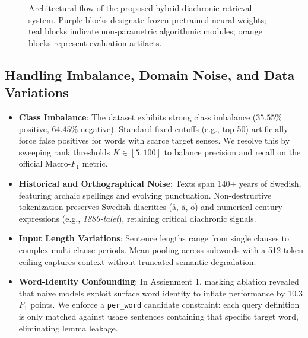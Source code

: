 \begin{figure}[H]
\caption{Architectural flow of the proposed hybrid diachronic retrieval system. Purple blocks designate frozen pretrained neural weights; teal blocks indicate non-parametric algorithmic modules; orange blocks represent evaluation artifacts.}
\label{fig:method_pipeline}
\end{figure}

\subsection{Handling Imbalance, Domain Noise, and Data Variations}
\begin{itemize}
    \item \textbf{Class Imbalance}: The dataset exhibits strong class imbalance ($35.55\%$ positive, $64.45\%$ negative). Standard fixed cutoffs (e.g., top-50) artificially force false positives for words with scarce target senses. We resolve this by sweeping rank thresholds $K \in [5, 100]$ to balance precision and recall on the official Macro-$F_1$ metric.
    \item \textbf{Historical and Orthographical Noise}: Texts span 140+ years of Swedish, featuring archaic spellings and evolving punctuation. Non-destructive tokenization preserves Swedish diacritics (\aa, \"a, \"o) and numerical century expressions (e.g., \textit{1880-talet}), retaining critical diachronic signals.
    \item \textbf{Input Length Variations}: Sentence lengths range from single clauses to complex multi-clause periods. Mean pooling across subwords with a 512-token ceiling captures context without truncated semantic degradation.
    \item \textbf{Word-Identity Confounding}: In Assignment 1, masking ablation revealed that naive models exploit surface word identity to inflate performance by 10.3 $F_1$ points. We enforce a \texttt{per\_word} candidate constraint: each query definition is only matched against usage sentences containing that specific target word, eliminating lemma leakage.
\end{itemize}

